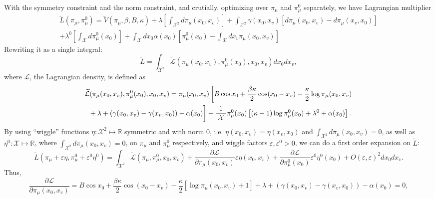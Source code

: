 \documentclass[12pt]{article}
\numberwithin{equation}{section}
\begin{document}
With the symmetry constraint and the norm constraint, and crutially, optimizing over $\pi_\mu$ and $\pi_\mu^0$ separately, we have Lagrangian multiplier
\begin{multline*}
    \widetilde{L}(\pi_\mu, \pi_\mu^0) = \widetilde{V}(\pi_\mu, \beta, B, \kappa) + \lambda \left[\int_{\mathcal{X}^2} d\pi_\mu(x_0, x_v)\right] + \int_{\mathcal{X}^2}\gamma(x_0, x_v) [d\pi_\mu(x_0, x_v) - d\pi_\mu(x_v, x_0)] \\
    + \lambda^0 \left[\int_{\mathcal{X}} d\pi_\mu^0(x_0)\right] + \int_{\mathcal{X}} dx_0 \alpha(x_0) \left[\pi_\mu^0(x_0) - \int_{\mathcal{X}} dx_v \pi_\mu(x_0, x_v)\right]
\end{multline*}
Rewriting it as a single integral:
\begin{equation*}
    \widetilde{L} = \int_{\mathcal{X}^2} \widetilde{\mathcal{L}}(\pi_\mu(x_0, x_v), \pi_\mu^0(x_0), x_0, x_v) dx_0 dx_v ,
\end{equation*}
where $\mathcal{L}$, the Lagrangian density, is defined as
\begin{multline*}
    \widetilde{\mathcal{L}}(\pi_\mu(x_0, x_v), \pi_\mu^0(x_0), x_0, x_v) = \pi_\mu(x_0, x_v)\left[B\cos x_0 + \frac{\beta\kappa}{2}\cos(x_0-x_v)- \frac\kappa2\log\pi_\mu(x_0, x_v)\right.                                     \\
        \left. \frac{\vphantom{\beta}}{\vphantom{2}}+ \lambda + (\gamma(x_0, x_v) - \gamma(x_v, x_0)) - \alpha(x_0)\right]
    + \frac{1}{|\mathcal{X}|} \pi_\mu^0(x_0)\left[(\kappa-1)\log\pi_\mu^0(x_0) + \lambda^0 + \alpha(x_0)\right].
\end{multline*}
By using ``wiggle'' functions $\eta:\mathcal{X}^2\mapsto \mathbb{R}$ symmetric and with norm 0,
i.e. $\eta(x_0, x_v) =\eta(x_v, x_0)$ and $\int_{\mathcal{X}^2}d\pi_\mu(x_0, x_v) = 0$,
as well as $\eta^0: \mathcal{X}\mapsto\mathbb{R}$, where $\int_{\mathcal{X}^2}d\pi_\mu(x_0, x_v) = 0$, on $\pi_\mu$ and $\pi_\mu^0$ respectively,
and wiggle factors $\varepsilon, \varepsilon^0 > 0$, we can do a first order expansion on $\widetilde{L}$:
\begin{equation*}
    \widetilde{L}(\pi_\mu+\varepsilon\eta, \pi_\mu^0+\varepsilon^0\eta^0) = \int_{\mathcal{X}^2} \widetilde{\mathcal{L}}(\pi_\mu, \pi_\mu^0, x_0, x_v) + \frac{\partial\mathcal{L}}{\partial\pi_\mu(x_0, x_v)}\varepsilon\eta(x_0, x_v) + \frac{\partial\mathcal{L}}{\partial\pi_\mu^0(x_0)}\varepsilon^0\eta^0(x_0) + O(\varepsilon, \varepsilon)^2 dx_0 dx_v .
\end{equation*}
Thus,
\begin{equation}
    \label{Eq.XY-Lagrange-pi-mu}
    \frac{\partial\mathcal{L}}{\partial\pi_\mu(x_0, x_v)} = B\cos x_0 + \frac{\beta\kappa}{2}\cos(x_0-x_v)- \frac\kappa2\left[\log\pi_\mu(x_0, x_v)+1\right] + \lambda + (\gamma(x_0, x_v) - \gamma(x_v, x_0)) - \alpha(x_0) = 0,
\end{equation}
\end{document}
